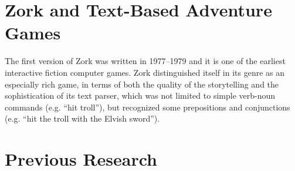 \section{Zork and Text-Based Adventure Games}
The first version of Zork was written in 1977–1979 and it is one of the earliest interactive fiction computer games. Zork distinguished itself in its genre as an especially rich game, in terms of both the quality of the storytelling and the sophistication of its text parser, which was not limited to simple verb-noun commands (e.g. ``hit troll''), but recognized some prepositions and conjunctions (e.g. ``hit the troll with the Elvish sword''). \citep{Zork}

\section{Previous Research}